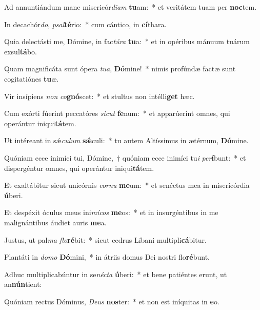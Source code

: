 \item Ad annuntiándum mane misericór\textit{di}\textit{am} \textbf{tu}am:~* et veritátem tuam per \textbf{noc}tem.
\item In decachór\textit{do}, \textit{psal}\textbf{té}rio:~* cum cántico, in \textbf{cí}thara.
\item Quia delectásti me, Dómine, in fac\textit{tú}\textit{ra} \textbf{tu}a:~* et in opéribus mánuum tuárum exsul\textbf{tá}bo.
\item Quam magnificáta sunt ópera \textit{tu}\textit{a}, \textbf{Dó}mine!~* nimis profúndæ factæ sunt cogitatiónes \textbf{tu}æ.
\item Vir insípiens \textit{non} \textit{co}\textbf{gnó}scet:~* et stultus non intélli\textbf{get} hæc.
\item Cum exórti fúerint peccatóres \textit{sic}\textit{ut} \textbf{fe}num:~* et apparúerint omnes, qui operántur iniqui\textbf{tá}tem.
\item Ut intéreant in sǽ\textit{cu}\textit{lum} \textbf{sǽ}culi:~* tu autem Altíssimus in ætérnum, \textbf{Dó}mine.
\item Quóniam ecce inimíci tui, Dómine,~† quóniam ecce inimíci tu\textit{i} \textit{per}\textbf{í}bunt:~* et dispergéntur omnes, qui operántur iniqui\textbf{tá}tem.
\item Et exaltábitur sicut unicórnis \textit{cor}\textit{nu} \textbf{me}um:~* et senéctus mea in misericórdia \textbf{ú}beri.
\item Et despéxit óculus meus ini\textit{mí}\textit{cos} \textbf{me}os:~* et in insurgéntibus in me malignántibus áudiet auris \textbf{me}a.
\item Justus, ut pal\textit{ma} \textit{flo}\textbf{ré}bit:~* sicut cedrus Líbani multipli\textbf{cá}bitur.
\item Plantáti in \textit{do}\textit{mo} \textbf{Dó}mini,~* in átriis domus Dei nostri flo\textbf{ré}bunt.
\item Adhuc multiplicabúntur in se\textit{néc}\textit{ta} \textbf{ú}beri:~* et bene patiéntes erunt, ut an\textbf{nún}tient:
\item Quóniam rectus Dóminus, \textit{De}\textit{us} \textbf{nos}ter:~* et non est iníquitas in \textbf{e}o.
